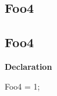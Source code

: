 \documentclass{report}
\newif\ifpdf
\begin{document}
\subsection*{\large{\textbf{Foo4}}\normalsize\hspace{1ex}\hrulefill}
\else
\subsection*{Foo4}
\fi
\label{ok_if_directive-Foo4}
\begin{list}{}{
\setlength{\itemindent}{0cm}
\setlength{\listparindent}{0cm}
\setlength{\leftmargin}{\evensidemargin}
\addtolength{\leftmargin}{\tmplength}
\settowidth{\labelsep}{X}
\addtolength{\leftmargin}{\labelsep}
\setlength{\labelwidth}{\tmplength}
}
\item[\textbf{Declaration}\hfill]
\ifpdf
\begin{flushleft}
\fi
\begin{ttfamily}
Foo4 = 1;\end{ttfamily}

\ifpdf
\end{flushleft}
\fi

\end{list}
\end{document}
